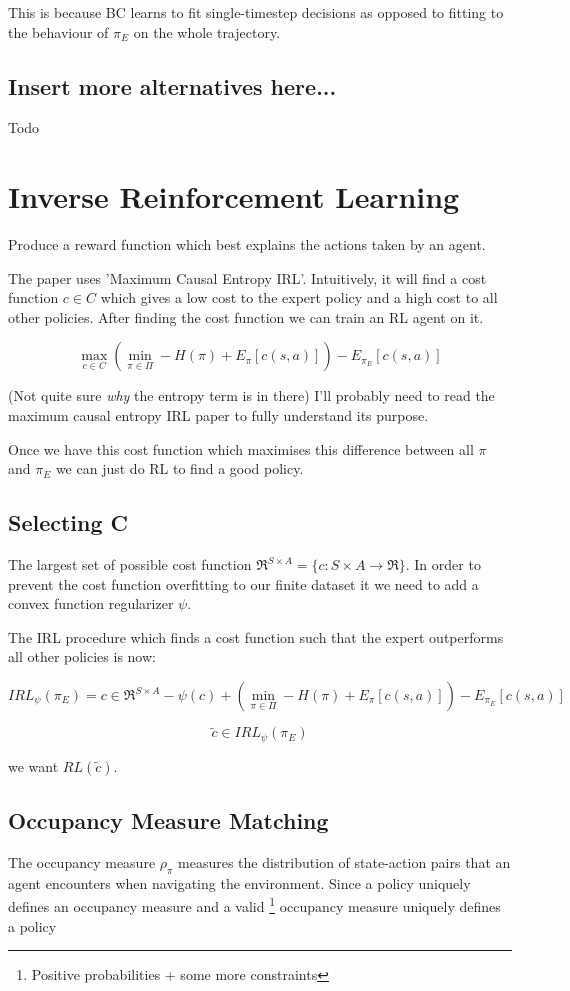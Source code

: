 \documentclass{article}
\begin{document}
This is because BC learns to fit single-timestep decisions as opposed to fitting to the behaviour of \(\pi_{E}\) on the whole trajectory.

\subsection{Insert more alternatives here...}
Todo

\section{Inverse Reinforcement Learning}
Produce a reward function which best explains the actions taken by an agent.

The paper uses 'Maximum Causal Entropy IRL'. Intuitively, it will find a cost function \(c \in C\) which gives a low cost to the expert policy and a high cost to all other policies. After finding the cost function we can train an RL agent on it.

\[\max_{c \in C}\left( \min_{\pi \in \Pi} - H(\pi) + E_{\pi}[c(s,a)] \right) -E_{\pi_{E}}[c(s,a)] \]

(Not quite sure \emph{why} the entropy term is in there) I'll probably need to read the maximum causal entropy IRL paper to fully understand its purpose.

Once we have this cost function which maximises this difference between all \(\pi\) and \(\pi_{E}\) we can just do RL to find a good policy.

\subsection{Selecting C}

The largest set of possible cost function \( \Re^{S \times A} = \{c : S \times A \to \Re\} \).
In order to prevent the cost function overfitting to our finite dataset it we need to add a convex function regularizer \(\psi\).

The IRL procedure which finds a cost function such that the expert outperforms all other policies is now:

\[IRL_{\psi}(\pi_{E}) = {c \in \Re^{S \times A}} - \psi(c) + (\min_{\pi \in \Pi} - H(\pi) + E_{\pi}[c(s,a)]) - E_{\pi_{E}}[c(s,a)]\]

\[\tilde{c} \in IRL_{\psi}(\pi_{E})\]

we want \(RL(\tilde{c})\).


\subsection{Occupancy Measure Matching}
The occupancy measure \(\rho_\pi\) measures the distribution of state-action pairs that an agent encounters when navigating the environment.
Since a policy uniquely defines an occupancy measure and a valid \footnote{Positive probabilities + some more constraints} occupancy measure uniquely defines a policy
\end{document}
